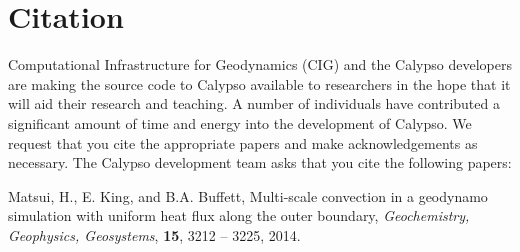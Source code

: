 \section{Citation}
\label{section:citation}

Computational Infrastructure for Geodynamics (CIG) and the Calypso developers are making the source code to Calypso available to researchers in the hope that it will aid their research and teaching. A number of individuals have contributed a significant amount of time and energy into the development of Calypso. We request that you cite the appropriate papers and make acknowledgements as necessary. The Calypso development team asks that you cite the following papers:

Matsui, H., E. King, and B.A. Buffett, Multi-scale convection in a geodynamo simulation with uniform heat flux along the outer boundary, {\it Geochemistry, Geophysics, Geosystems}, {\bf 15}, 3212 -- 3225, 2014.
